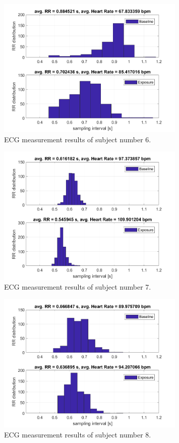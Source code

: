 \begin{figure}[H]
\centering
\includegraphics[width=0.8\textwidth]{images/6ECG.png}
\caption{ECG measurement results of subject number 6.}
\label{EDAtabImg}
\end{figure}

\begin{figure}[H]
\centering
\includegraphics[width=0.8\textwidth]{images/7ECG.png}
\caption{ECG measurement results of subject number 7.}
\label{EDAtabImg}
\end{figure}

\begin{figure}[H]
\centering
\includegraphics[width=0.8\textwidth]{images/8ECG.png}
\caption{ECG measurement results of subject number 8.}
\label{EDAtabImg}
\end{figure}

